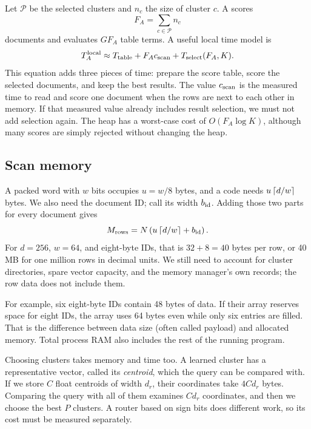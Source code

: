 Let $\mathcal P$ be the selected clusters and $n_c$ the size of cluster $c$. A scores
\[
F_A=\sum_{c\in\mathcal P}n_c
\]
documents and evaluates $G F_A$ table terms. A useful local time model is
\begin{equation}
T_A^{\rm local}\approx T_{\rm table}+F_Ac_{\rm scan}+T_{\rm select}(F_A,K).
\label{eq:scan-time}
\end{equation}
This equation adds three pieces of time: prepare the score table, score the selected documents,
and keep the best results. The value $c_{\rm scan}$ is the measured time to read and score
one document when the rows are next to each other in memory. If that measured value already
includes result selection, we must not add selection again. The heap has a worst-case cost
of $O(F_A\log K)$, although many scores are simply rejected without changing the heap.

\subsection{Scan memory}
A packed word with $w$ bits occupies $u=w/8$ bytes, and a code needs $u\left\lceil d/w\right\rceil$ bytes. We also need the document ID; call its width $b_{\rm id}$.
Adding those two parts for every document gives
\begin{equation}
M_{\rm rows}=N\left(u\left\lceil d/w\right\rceil+b_{\rm id}\right).
\label{eq:rows}
\end{equation}
For $d=256$, $w=64$, and eight-byte IDs, that is $32+8=40$ bytes per row, or 40 MB for one
million rows in decimal units. We still need to account for cluster directories, spare vector
capacity, and the memory manager's own records; the row data does not include them.

For example, six eight-byte IDs contain 48 bytes of data. If their array reserves space for
eight IDs, the array uses 64 bytes even while only six entries are filled. That is the difference
between data size (often called payload) and allocated memory. Total process RAM also includes
the rest of the running program.

Choosing clusters takes memory and time too. A learned cluster has a representative vector,
called its \emph{centroid}, which the query can be compared with. If we store $C$ float
centroids of width $d_r$, their coordinates take $4Cd_r$ bytes. Comparing the query with all
of them examines $Cd_r$ coordinates, and then we choose the best $P$ clusters. A router based
on sign bits does different work, so its cost must be measured separately.

